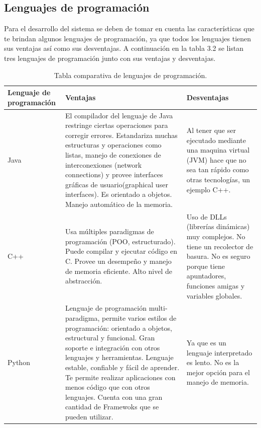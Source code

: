 \documentclass[12pt]{report}
\begin{document}
\subsection{Lenguajes de programación}
Para el desarrollo del sistema se deben de tomar en cuenta las características que te brindan algunos lenguajes de programación, ya que todos los lenguajes tienen sus ventajas así como sus desventajas. A continuación en la tabla 3.2 se listan tres lenguajes de programación junto con sus ventajas y desventajas.

\begin{table}[H]
\begin{center}
\begin{tabular}{|p{25mm}|p{60mm}|p{60mm}|}
\hline
Lenguaje de programación & Ventajas & Desventajas\\
\hline \hline 
Java & El compilador del lenguaje de Java  restringe ciertas operaciones para corregir errores. Estandariza muchas estructuras y operaciones como listas, manejo de conexiones de interconexiones (network connections) y provee interfaces gráficas de usuario(graphical user interfaces). Es orientado a objetos. Manejo automático de la memoria.\cite{java} & Al tener que ser ejecutado mediante una maquina virtual (JVM) hace que no sea tan rápido como  otras tecnologías, un ejemplo C++.\cite{java}\\
\hline
C++ & Usa múltiples paradigmas de programación (POO, estructurado). Puede compilar y ejecutar código en C. Provee un desempeño y manejo de memoria eficiente. Alto nivel de abstracción.\cite{cplus} & Uso de DLLs (librerías dinámicas) muy complejos. No tiene un recolector de basura. No es seguro porque tiene apuntadores, funciones amigas y variables globales.\cite{cplus}\\
\hline
Python & Lenguaje de programación multi-paradigma, permite varios estilos de programación: orientado a objetos, estructural y funcional.
Gran soporte e integración con otros lenguajes y herramientas.
Lenguaje estable, confiable y fácil de aprender.
Te permite realizar aplicaciones con menos código que con otros lenguajes. Cuenta con una gran cantidad de Framewoks que se pueden utilizar.\cite{vibora}
 & Ya que es un lenguaje interpretado es lento. No es la mejor opción para el manejo de memoria.\cite{vibora}\\
\hline
\end{tabular}
\caption{Tabla comparativa de lenguajes de programación.}
\end{center}
\end{table}
\end{document}
